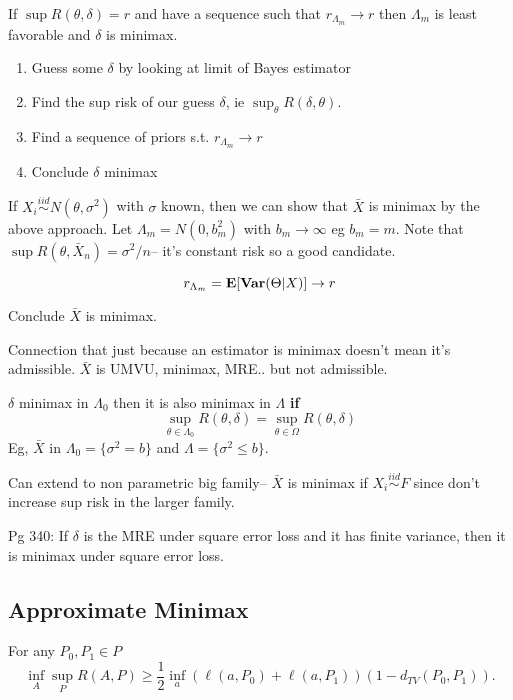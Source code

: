 \documentclass{article}
\newcommand{\simiid}{\overset{iid}\sim }
\begin{document}
\begin{recipe}
If $\sup R(\theta,\delta) = r$ and have a sequence such that $r_{\Lambda_m} \to r$ then $\Lambda_m$ is least favorable and $\delta$ is minimax. 
\begin{enumerate}
	\item Guess some $\delta$ by looking at limit of Bayes estimator
	\item Find the sup risk of our guess $\delta$, ie $\sup_\theta R(\delta, \theta)$.
	\item Find a sequence of priors s.t. $r_{\Lambda_m} \to r$ 
	\item Conclude $\delta$ minimax
\end{enumerate}
\end{recipe}
\begin{example}
If $X_i \simiid N(\theta,\sigma^2)$ with $\sigma$ known, then we can show that $\bar X$ is minimax by the above approach. Let $\Lambda_m = N(0,b_m^2)$ with $b_m \to \infty$ eg $b_m = m$. Note that $\sup R(\theta, \bar X_n) = \sigma^2/n$-- it's constant risk so a good candidate. 

$$r_{\Lambda_m} = \mathbf{E} [\mathbf{Var} (\Theta|X)] \to r$$

Conclude $\bar X$ is minimax.
\end{example}

Connection that just because an estimator is minimax doesn't mean it's admissible. $\bar X$ is UMVU, minimax, MRE.. but not admissible. 
\begin{recipe}
$\delta$ minimax in $\Lambda_0$ then it is also minimax in $\Lambda$ \textbf{if} 
$$\sup_{\theta\in \Lambda_0} R(\theta,\delta) = \sup_{\theta \in \Omega} R(\theta,\delta)$$
Eg, $\bar X$ in $\Lambda_0 = \{\sigma^2 = b\}$ and $\Lambda = \{\sigma^2 \leq b\}$. 
\end{recipe}
Can extend to non parametric big family-- $\bar X$ is minimax if $X_i \simiid F$ since don't increase sup risk in the larger family. 

\begin{theorem}
Pg 340: If $\delta$ is the MRE under square error loss and it has finite variance, then it is minimax under square error loss. 
\end{theorem}
\subsection{Approximate Minimax}
\begin{theorem}
For any $P_0 , P_1 \in P$
$$\inf_A \sup_P R(A,P) \geq \frac{1}{2} \inf_{a} (\ell(a,P_0) + \ell(a,P_1)) (1-d_{TV} (P_0,P_1)).$$
\end{theorem}
\end{document}
